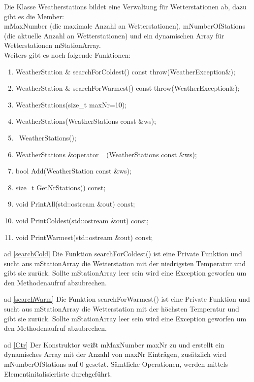 \documentclass[10pt,a4paper, parskip=half]{scrartcl}
\begin{document}
Die Klasse Weatherstations bildet eine Verwaltung für Wetterstationen ab, dazu gibt es die Member:
\\mMaxNumber (die maximale Anzahl an Wetterstationen), mNumberOfStations (die aktuelle Anzahl an Wetterstationen) und ein dynamischen Array
für Wetterstationen mStationArray.
\\Weiters gibt es noch folgende Funktionen:

\begin{enumerate}
	\item WeatherStation \& searchForColdest() const throw(WeatherException\&);\label{searchCold}
    \item WeatherStation \& searchForWarmest() const throw(WeatherException\&);\label{searchWarm}
    \item WeatherStations(size\_t maxNr=10);\label{Ctr}
	\item WeatherStations(WeatherStations const \&ws);\label{copyCtr}
	\item ~WeatherStations();\label{Destr}
	\item WeatherStations \&operator =(WeatherStations const \&ws);\label{asign}
	\item bool Add(WeatherStation const \&ws);\label{add}
	\item size\_t GetNrStations() const;\label{getNr}
    \item void PrintAll(std::ostream \&out) const;\label{printAll}
    \item void PrintColdest(std::ostream \&out) const;\label{printCold}
    \item void PrintWarmest(std::ostream \&out) const;\label{printWarm}
\end{enumerate}

ad \ref{searchCold}
Die Funktion searchForColdest() ist eine Private Funktion und sucht aus mStationArray die Wetterstation mit der niedrigsten Temperatur und gibt sie zurück.
Sollte mStationArray leer sein wird eine Exception geworfen um den Methodenaufruf abzubrechen.

ad \ref{searchWarm}
Die Funktion searchForWarmest() ist eine Private Funktion und sucht aus mStationArray die Wetterstation mit der höchsten Temperatur und gibt sie zurück.
Sollte mStationArray leer sein wird eine Exception geworfen um den Methodenaufruf abzubrechen.

ad \ref{Ctr}
Der Konstruktor weißt mMaxNumber maxNr zu und erstellt ein dynamisches Array mit der Anzahl von maxNr Einträgen, zusätzlich wird mNumberOfStations auf 0 gesetzt.
Sämtliche Operationen, werden mittels Elementinitalisierliste durchgeführt.
\end{document}
